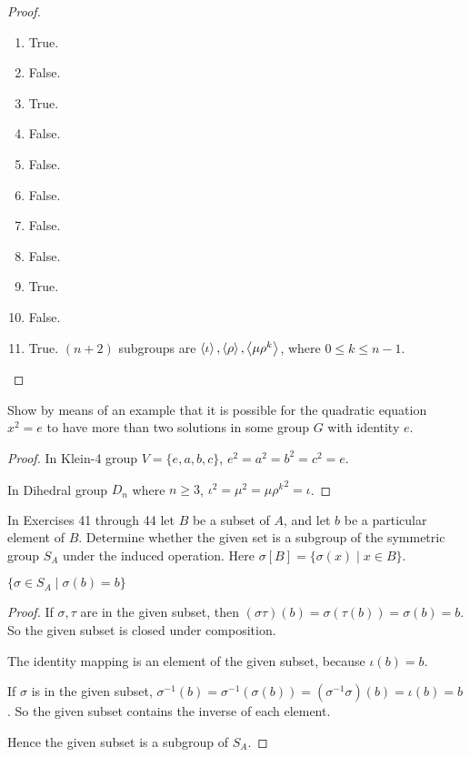 \begin{proof}
    \begin{enumerate}[label={\textbf{\alph*}}]
        \item True.
        \item False.
        \item True.
        \item False.
        \item False.
        \item False.
        \item False.
        \item False.
        \item True.
        \item False.
        \item True. $(n+2)$ subgroups are $\left\langle{\iota}\right\rangle, \left\langle{\rho}\right\rangle, \left\langle{\mu\rho^{k}}\right\rangle$, where $0\leq k \leq n-1$.
    \end{enumerate}
\end{proof}

\newpage
\begin{exercise}
    Show by means of an example that it is possible for the quadratic equation $x^{2} = e$ to have more than two solutions in some group $G$ with identity $e$.
\end{exercise}

\begin{proof}
    In Klein-4 group $V = \{ e, a, b, c \}$, $e^{2} = a^{2} = b^{2} = c^{2} = e$.

    In Dihedral group $D_{n}$ where $n\geq 3$, $\iota^{2} = {\mu}^{2} = {\mu\rho^{k}}^{2} = \iota$.
\end{proof}

In Exercises 41 through 44 let $B$ be a subset of $A$, and let $b$ be a particular element of $B$. Determine whether the given set is a subgroup of the symmetric group $S_{A}$ under the induced operation. Here $\sigma[B] = \{ \sigma(x) \mid x\in B \}$.

\newpage
\begin{exercise}
    $\{ \sigma\in S_{A} \mid \sigma(b) = b \}$
\end{exercise}

\begin{proof}
    If $\sigma, \tau$ are in the given subset, then $(\sigma\tau)(b) = \sigma(\tau(b)) = \sigma(b) = b$. So the given subset is closed under composition.

    The identity mapping is an element of the given subset, because $\iota(b) = b$.

    If $\sigma$ is in the given subset, $\sigma^{-1}(b) = \sigma^{-1}(\sigma(b)) = (\sigma^{-1}\sigma)(b) = \iota(b) = b$. So the given subset contains the inverse of each element.

    Hence the given subset is a subgroup of $S_{A}$.
\end{proof}

